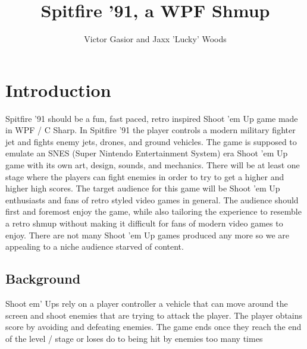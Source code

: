 \documentclass[10pt,conference,onecolumn,compsoc]{IEEEtran}
\begin{document}
\title{Spitfire '91, a WPF Shmup}
%
%


\author{Victor Gasior and Jaxx 'Lucky' Woods
}



\maketitle



\IEEEdisplaynontitleabstractindextext

\IEEEpeerreviewmaketitle



\section{Introduction}

Spitfire '91 should be a fun, fast paced, retro inspired Shoot 'em Up game made in WPF / C Sharp. In Spitfire '91 the player controls a modern military fighter jet and fights enemy jets, drones, and ground vehicles. The game is supposed to emulate an SNES (Super Nintendo Entertainment System) era Shoot 'em Up game with its own art, design, sounds, and mechanics. There will be at least one stage where the players can fight enemies in order to try to get a higher and higher high scores. The target audience for this game will be Shoot 'em Up enthusiasts and fans of retro styled video games in general. The audience should first and foremost enjoy the game, while also tailoring the experience to resemble a retro shmup without making it difficult for fans of modern video games to enjoy.  There are not many Shoot 'em Up games produced any more so we are appealing to a niche audience starved of content.



\subsection{Background}
Shoot em' Ups rely on a player controller a vehicle that can move around the screen and shoot enemies that are trying to attack the player. The player obtains score by avoiding and defeating enemies. The game ends once they reach the end of the level / stage or loses do to being hit by enemies too many times
\end{document}
